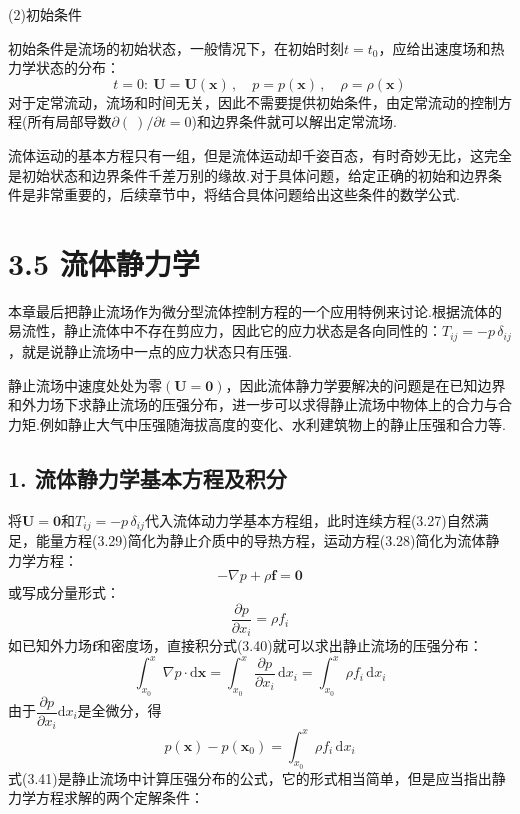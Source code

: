 (2)初始条件

初始条件是流场的初始状态，一般情况下，在初始时刻$t=t_0$，应给出速度场和热力学状态的分布：
\begin{equation*}
t=0:\ \boldsymbol{U}=\boldsymbol{U}(\boldsymbol{x})\,,\quad p=p(\boldsymbol{x})\,,\quad \rho=\rho(\boldsymbol{x})
\tag{3.39}
\end{equation*}
对于定常流动，流场和时间无关，因此不需要提供初始条件，由定常流动的控制方程(所有局部导数$\partial(\ )/\partial t=0$)和边界条件就可以解出定常流场.

流体运动的基本方程只有一组，但是流体运动却千姿百态，有时奇妙无比，这完全是初始状态和边界条件千差万别的缘故.对于具体问题，给定正确的初始和边界条件是非常重要的，后续章节中，将结合具体问题给出这些条件的数学公式.

\section*{3.5  流体静力学}

本章最后把静止流场作为微分型流体控制方程的一个应用特例来讨论.根据流体的易流性，静止流体中不存在剪应力，因此它的应力状态是各向同性的：$T_{ij}=-p\,\delta_{ij}$，就是说静止流场中一点的应力状态只有压强.

静止流场中速度处处为零$(\boldsymbol{U}=\boldsymbol{0})$，因此流体静力学要解决的问题是在已知边界和外力场下求静止流场的压强分布，进一步可以求得静止流场中物体上的合力与合力矩.例如静止大气中压强随海拔高度的变化、水利建筑物上的静止压强和合力等.

\subsection*{1. 流体静力学基本方程及积分}

将$\boldsymbol{U}=\boldsymbol{0}$和$T_{ij}=-p\,\delta_{ij}$代入流体动力学基本方程组，此时连续方程(3.27)自然满足，能量方程(3.29)简化为静止介质中的导热方程，运动方程(3.28)简化为流体静力学方程：
\begin{equation*}
-\nabla p+\rho\boldsymbol{f}=\boldsymbol{0}
\tag{3.40a}
\end{equation*}
或写成分量形式：
\begin{equation*}
\frac{\partial p}{\partial x_i}=\rho f_i
\tag{3.40b}
\end{equation*}
如已知外力场$\boldsymbol{f}$和密度场，直接积分式(3.40)就可以求出静止流场的压强分布：
\[
\int_{x_0}^{x}\nabla p\cdot\mathrm{d}\boldsymbol{x}=\int_{x_0}^{x}\frac{\partial p}{\partial x_i}\,\mathrm{d}x_i=\int_{x_0}^{x}\rho f_i\,\mathrm{d}x_i
\]
由于$\dfrac{\partial p}{\partial x_i}\mathrm{d}x_i$是全微分，得
\begin{equation*}
p(\boldsymbol{x})-p(\boldsymbol{x}_0)=\int_{x_0}^{x}\rho f_i\,\mathrm{d}x_i
\tag{3.41}
\end{equation*}
式(3.41)是静止流场中计算压强分布的公式，它的形式相当简单，但是应当指出静力学方程求解的两个定解条件：

